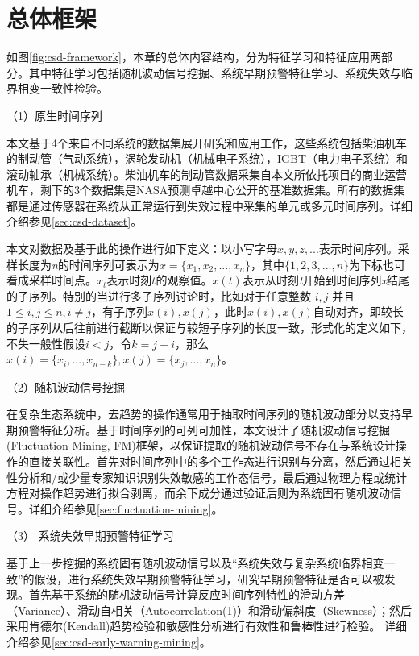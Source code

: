 \section{总体框架}
\label{sec:csd-framework}

如图\ref{fig:csd-framework}，本章的总体内容结构，分为特征学习和特征应用两部分。其中特征学习包括随机波动信号挖掘、系统早期预警特征学习、系统失效与临界相变一致性检验。

（1）原生时间序列

本文基于4个来自不同系统的数据集展开研究和应用工作，这些系统包括柴油机车的制动管（气动系统），涡轮发动机（机械电子系统），IGBT（电力电子系统）和滚动轴承（机械系统）。柴油机车的制动管数据采集自本文所依托项目的商业运营机车，剩下的3个数据集是NASA预测卓越中心公开的基准数据集\cite{nasa2018}。所有的数据集都是通过传感器在系统从正常运行到失效过程中采集的单元或多元时间序列。详细介绍参见\ref{sec:csd-dataset}。

本文对数据及基于此的操作进行如下定义：以小写字母$x,y,z,...$表示时间序列。采样长度为\emph{n}的时间序列可表示为$x=\{x_{1}, x_{2}, ..., x_{n}\}$，其中$\{1,2,3,...,n\}$为下标也可看成采样时间点。$x_{t}$表示时刻$t$的观察值。$x(t)$表示从时刻\emph{t}开始到时间序列\emph{x}结尾的子序列。特别的当进行多子序列讨论时，比如对于任意整数 $i,j$ 并且$1 \leqslant  i,j \leqslant n, i \neq j$，有子序列$x(i),x(j)$，此时$x(i),x(j)$自动对齐，即较长的子序列从后往前进行截断以保证与较短子序列的长度一致，形式化的定义如下，不失一般性假设$i<j$，令$k=j-i$，那么$x(i)=\{x_{i}, ..., x_{n-k}\}, x(j) = \{x_{j}, ..., x_{n}\}$。

（2）随机波动信号挖掘

在复杂生态系统中，去趋势\cite{wang2012flickering}的操作通常用于抽取时间序列的随机波动部分以支持早期预警特征分析\cite{cotilla2012predicting}。基于时间序列的可列可加性，本文设计了随机波动信号挖掘(Fluctuation Mining, FM)框架，以保证提取的随机波动信号不存在与系统设计操作的直接关联性。首先对时间序列中的多个工作态进行识别与分离，然后通过相关性分析和/或少量专家知识识别失效敏感的工作态信号，最后通过物理方程或统计方程对操作趋势进行拟合剥离，而余下成分通过验证后则为系统固有随机波动信号。详细介绍参见\ref{sec:fluctuation-mining}。

（3） 系统失效早期预警特征学习

基于上一步挖掘的系统固有随机波动信号以及“系统失效与复杂系统临界相变一致”的假设，进行系统失效早期预警特征学习，研究早期预警特征是否可以被发现。首先基于系统的随机波动信号计算反应时间序列特性的滑动方差（Variance）、滑动自相关（Autocorrelation(1)）和滑动偏斜度（Skewness）；然后采用肯德尔(Kendall)趋势检验和敏感性分析进行有效性和鲁棒性进行检验。
详细介绍参见\ref{sec:csd-early-warning-mining}。

